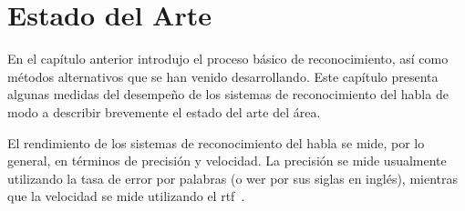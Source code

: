 \chapter{Estado del Arte}
\label{sec:estado-arte}

En el cap\'itulo anterior introdujo el proceso b\'asico de reconocimiento, as\'i como m\'etodos
alternativos que se han venido desarrollando. Este cap\'itulo presenta algunas medidas del desempe\~no 
de los sistemas de reconocimiento del habla de modo a describir brevemente el estado del arte del área.

El rendimiento de los sistemas de reconocimiento del habla se mide, por lo general, en t\'erminos
de precisi\'on y velocidad. La precisi\'on se mide usualmente utilizando la tasa de error por palabras
(o \gls{wer} por sus siglas en ingl\'es), mientras que la velocidad se mide utilizando el 
\mbox{\gls{rtf} \cite{GaikwadAReview2010}.}


